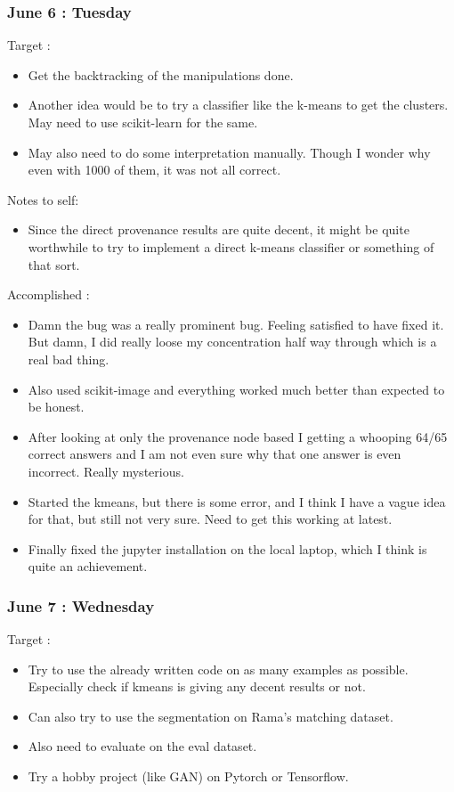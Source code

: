 \documentclass{article}
\begin{document}
\subsubsection{June 6 : Tuesday}
Target :
\begin{itemize}
\item Get the backtracking of the manipulations done.
\item Another idea would be to try a classifier like the k-means to get the clusters. May need to use scikit-learn for the same.
\item May also need to do some interpretation manually. Though I wonder why even with 1000 of them, it was not all correct.
\end{itemize}

Notes to self:
\begin{itemize}
\item Since the direct provenance results are quite decent, it might be quite worthwhile to try to implement a direct k-means classifier or something of that sort.
\end{itemize}

Accomplished :
\begin{itemize}
\item Damn the bug was a really prominent bug. Feeling satisfied to have fixed it. But damn, I did really loose my concentration half way through which is a real bad thing.
\item Also used scikit-image and everything worked much better than expected to be honest.
\item After looking at only the provenance node based I getting a whooping 64/65 correct answers and I am not even sure why that one answer is even incorrect. Really mysterious.
\item Started the kmeans, but there is some error, and I think I have a vague idea for that, but still not very sure. Need to get this working at latest.
\item Finally fixed the jupyter installation on the local laptop, which I think is quite an achievement.
\end{itemize}

\subsubsection{June 7 : Wednesday}
Target :
\begin{itemize}
\item Try to use the already written code on as many examples as possible. Especially check if kmeans is giving any decent results or not.
\item Can also try to use the segmentation on Rama's matching dataset.
\item Also need to evaluate on the eval dataset.
\item Try a hobby project (like GAN) on Pytorch or Tensorflow.
\end{itemize}
\end{document}
